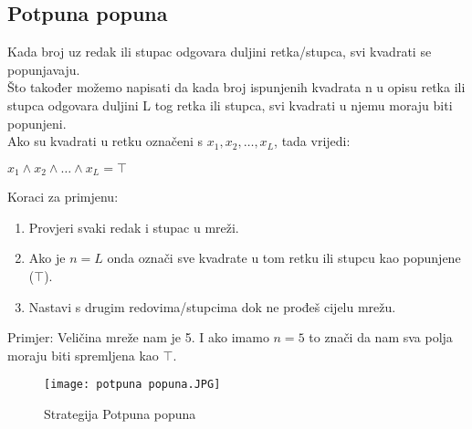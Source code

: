 \documentclass[a4paper,12pt]{article}
\begin{document}
\subsection{Potpuna popuna}
Kada broj uz redak ili stupac odgovara duljini retka/stupca, svi kvadrati se popunjavaju.\\
Što također možemo napisati da kada broj ispunjenih kvadrata n u opisu retka ili stupca odgovara duljini L tog retka ili stupca, svi kvadrati u njemu moraju biti popunjeni.\\
Ako su kvadrati u retku označeni s $x_1, x_2, \dots, x_L$, tada vrijedi:
\begin{center}
$x_1 \land x_2 \land \ldots \land x_L = \top$
\end{center}
\clearpage
Koraci za primjenu:
\begin{enumerate}
    \item Provjeri svaki redak i stupac u mreži.
    \item Ako je $n = L$ onda označi sve kvadrate u tom retku ili stupcu kao popunjene ($\top$).
    \item Nastavi s drugim redovima/stupcima dok ne prođeš cijelu mrežu.
\end{enumerate}

Primjer: Veličina mreže nam je 5. I ako imamo $n=5$ to znači da nam sva polja moraju biti spremljena  kao $\top$.

\begin{figure}[h]
\centering
\texttt{[image: potpuna popuna.JPG]}
\caption{Strategija Potpuna popuna}
\end{figure}
\end{document}

